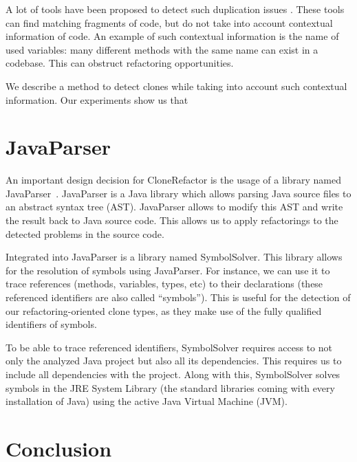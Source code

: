 \documentclass[sigconf,authordraft]{article}
\begin{document}
A lot of tools have been proposed to detect such duplication issues \cite{roy2009comparison, svajlenko2014evaluating, sheneamer2016survey}. These tools can find matching fragments of code, but do not take into account contextual information of code. An example of such contextual information is the name of used variables: many different methods with the same name can exist in a codebase. This can obstruct refactoring opportunities.

We describe a method to detect clones while taking into account such contextual information. Our experiments show us that


\section{JavaParser}
An important design decision for CloneRefactor is the usage of a library named JavaParser~\cite{tomassetti2017javaparser}. JavaParser is a Java library which allows parsing Java source files to an abstract syntax tree (AST). JavaParser allows to modify this AST and write the result back to Java source code. This allows us to apply refactorings to the detected problems in the source code.

Integrated into JavaParser is a library named SymbolSolver. This library allows for the resolution of symbols using JavaParser. For instance, we can use it to trace references (methods, variables, types, etc) to their declarations (these referenced identifiers are also called ``symbols''). This is useful for the detection of our refactoring-oriented clone types, as they make use of the fully qualified identifiers of symbols.

To be able to trace referenced identifiers, SymbolSolver requires access to not only the analyzed Java project but also all its dependencies. This requires us to include all dependencies with the project. Along with this, SymbolSolver solves symbols in the JRE System Library (the standard libraries coming with every installation of Java) using the active Java Virtual Machine (JVM). %

\section{Conclusion}



\end{document}
